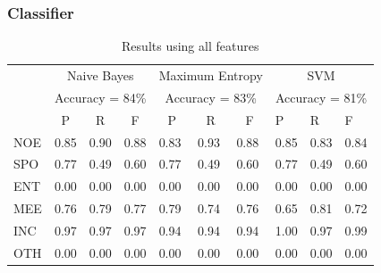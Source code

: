\documentclass[
10pt, %
a4paper, %
oneside, %
headinclude,footinclude, %
BCOR5mm, %
]{scrartcl}
\begin{document}
\subsubsection{Classifier}
\begin{table}[h]
\begin{tabular}{l|l|l|l|l|l|l|l|l|l|}
\cline{2-10}
                          & \multicolumn{3}{c|}{Naive Bayes}                                         & \multicolumn{3}{c|}{Maximum Entropy}                                     & \multicolumn{3}{c|}{SVM}             \\ \cline{2-10} 
                          & \multicolumn{3}{c|}{Accuracy = 84\%}                                     & \multicolumn{3}{c|}{Accuracy = 83\%}                                     & \multicolumn{3}{c|}{Accuracy = 81\%} \\ \cline{2-10} 
                          & \multicolumn{1}{c|}{P} & \multicolumn{1}{c|}{R} & \multicolumn{1}{c|}{F} & \multicolumn{1}{c|}{P} & \multicolumn{1}{c|}{R} & \multicolumn{1}{c|}{F} & P          & R          & F          \\ \hline
\multicolumn{1}{|l|}{NOE} & 0.85                   & 0.90                   & 0.88                   & 0.83                   & 0.93                   & 0.88                   & 0.85       & 0.83       & 0.84       \\ \hline
\multicolumn{1}{|l|}{SPO} & 0.77                   & 0.49                   & 0.60                   & 0.77                   & 0.49                   & 0.60                   & 0.77       & 0.49       & 0.60       \\ \hline
\multicolumn{1}{|l|}{ENT} & 0.00                   & 0.00                   & 0.00                   & 0.00                   & 0.00                   & 0.00                   & 0.00       & 0.00       & 0.00       \\ \hline
\multicolumn{1}{|l|}{MEE} & 0.76                   & 0.79                   & 0.77                   & 0.79                   & 0.74                   & 0.76                   & 0.65       & 0.81       & 0.72       \\ \hline
\multicolumn{1}{|l|}{INC} & 0.97                   & 0.97                   & 0.97                   & 0.94                   & 0.94                   & 0.94                   & 1.00       & 0.97       & 0.99       \\ \hline
\multicolumn{1}{|l|}{OTH} & 0.00                   & 0.00                   & 0.00                   & 0.00                   & 0.00                   & 0.00                   & 0.00       & 0.00       & 0.00       \\ \hline
\end{tabular}
\caption[Table caption text]{Results using all features }
\end{table}
\end{document}
